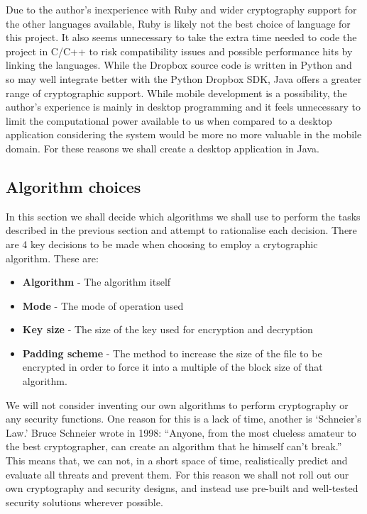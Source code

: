 \documentclass[12pt, titlepage]{article}
\begin{document}
\newline \indent Due to the author's inexperience with Ruby and wider cryptography support for the other languages available, Ruby is likely not the best choice of language for this project. It also seems unnecessary to take the extra time needed to code the project in C/C++ to risk compatibility issues and possible performance hits by linking the languages. While the Dropbox source code is written in Python and so may well integrate better with the Python Dropbox SDK, Java offers a greater range of cryptographic support.
\newline \indent While mobile development is a possibility, the author's experience is mainly in desktop programming and it feels unnecessary to limit the computational power available to us when compared to a desktop application considering the system would be more no more valuable in the mobile domain.
\newline \indent For these reasons we shall create a desktop application in Java.

\subsection{Algorithm choices}
In this section we shall decide which algorithms we shall use to perform the tasks described in the previous section and attempt to rationalise each decision.
\newline \indent There are 4 key decisions to be made when choosing to employ a crytographic algorithm. These are:
\begin{itemize}
	\item \textbf{Algorithm} - The algorithm itself
	\item \textbf{Mode} - The mode of operation used
	\item \textbf{Key size} - The size of the key used for encryption and decryption
	\item \textbf{Padding scheme} - The method to increase the size of the file to be encrypted in order to force it into a multiple of the block size of that algorithm.
\end{itemize}
We will not consider inventing our own algorithms to perform cryptography or any security functions. One reason for this is a lack of time, another is `Schneier's Law.' Bruce Schneier wrote in 1998: ``Anyone, from the most clueless amateur to the best cryptographer, can create an algorithm that he himself can't break.''\cite{schneierCipherDesign} This means that, we can not, in a short space of time, realistically predict and evaluate all threats and prevent them. For this reason we shall not roll out our own cryptography and security designs, and instead use pre-built and well-tested security solutions wherever possible.
\end{document}
